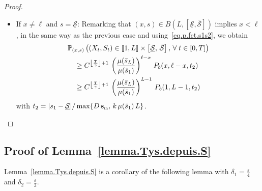 \documentclass[AHL,Unicode,longabstracts,published]{cedram}
\newcommand{\llbracket}{\mathopen{[\mkern -2.7mu[}}
\newcommand{\rrbracket}{\mathclose{]\mkern -2.7mu]}}
\newcommand{\PP}{\mathbb{P}}
\newcommand{\Sin}{{\mathbf s}_{\textrm{\tiny\rm in}}}
\newcommand{\Smin}{\underline{\mathcal{S}}}
\newcommand{\Smax}{\bar{\mathcal{S}}}
\newcommand{\barmu}{\mu(\bar s_1)}
\newcommand{\setunL}{\llbracket 1, L\rrbracket}
\newcommand{\1}{\mathbf{1}}
\let\oldforall\forall
\renewcommand*{\forall}{\mathrel{\oldforall}}
\begin{document}
\begin{proof}
\begin{itemize}
\item If $x\neq \ell$ and $s=\Smin$: Remarking that $(x,s)\in B(L,[\Smin,\Smax])$ implies $x < \ell$, in the same way as the previous case and using~\eqref{eq.p.fct.s1s2}, we obtain
\begin{align*}
 & \PP_{(x,s)}
\left(\left(X_t,S_t\right) \in \setunL \times \left[\Smin, \, \Smax\right], \,
\forall t\in[0,T]\right)
\\
& \quad \geq C^{\left\lfloor\frac{T}{\gamma}\right\rfloor+1}\, \left(\frac{\mu(\bar s_L)}{\barmu}\right)^{\ell-x}
\,P_b(x,\ell-x, t_2)
\\
&
\quad\geq C^{\left\lfloor\frac{T}{\gamma}\right\rfloor+1}\, \left(\frac{\mu(\bar s_L)}{\barmu}\right)^{L-1}\, P_b(1,L-1, t_2)
\end{align*}
with $t_2 = |s_1-\Smin|/\max\{D\,\Sin,\, k\,\barmu\,L\}$. \qedhere
\end{itemize}
\end{proof}


\subsection{Proof of Lemma~\ref{lemma.Tys.depuis.S}}\label{sec:T.depuis.S}



Lemma~\ref{lemma.Tys.depuis.S} is a corollary of the following lemma with $\delta_1=\frac{\varepsilon}{4}$ and $\delta_2=\frac{\varepsilon}{3}$.
\end{document}
